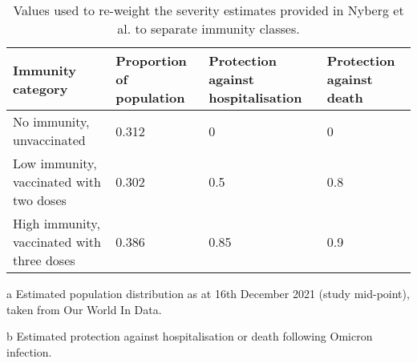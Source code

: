 \begin{table}
    \begin{threeparttable}
    \begin{tabularx}{\textwidth}{| X | X | X | X |}
        \hline
        \textbf{Immunity category} & \textbf{Proportion of population} \tnote{a} & 
        \textbf{Protection against hospitalisation} \tnote{b} & 
        \textbf{Protection against death} \tnote{b} \\
        \hline
        No immunity, unvaccinated & 0.312 & 0 & 0 \\
        \hline
        Low immunity, vaccinated with two doses & 0.302 & 0.5 & 0.8 \\
        \hline
        High immunity, vaccinated with three doses & 0.386 & 0.85 & 0.9 \\
        \hline
	\end{tabularx}
	\caption{Values used to re-weight the severity estimates provided in Nyberg et al. to separate immunity classes.}
	\label{tab:immunity_weighting}
    \begin{tablenotes}
        \item[a] Estimated population distribution as at 16th December 2021 (study mid-point),
        taken from Our World In Data.
        \item[b] Estimated protection against hospitalisation or death following Omicron infection.
    \end{tablenotes}
    \end{threeparttable}
\end{table}
